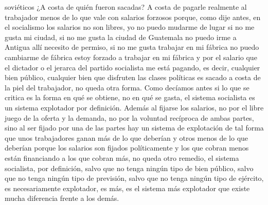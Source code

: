 soviéticos ¿A costa de quién fueron sacadas? A costa de pagarle realmente al trabajador menos de lo que vale con salarios forzosos porque, como dije antes, en el socialismo los salarios no son libres, yo no puedo mudarme de lugar si no me gusta mi ciudad, si no me gusta la ciudad de Guatemala no puedo irme a Antigua allí necesito de permiso, si no me gusta trabajar en mi fábrica no puedo cambiarme de fábrica estoy forzado a trabajar en mi fábrica y por el salario que el dictador o el jerarca del partido socialista me está pagando, es decir, cualquier bien público, cualquier bien que disfruten las clases políticas es sacado a costa de la piel del trabajador, no queda otra forma. Como decíamos antes si lo que se critica es la forma en qué se obtiene, no en qué se gasta, el sistema socialista es un sistema explotador por definición. Además al fijarse los salarios, no por el libre juego de la oferta y la demanda, no por la voluntad recíproca de ambas partes, sino al ser fijado por una de las partes hay un sistema de explotación de tal forma que unos trabajadores ganan más de lo que deberían y otros menos de lo que deberían porque los salarios son fijados políticamente y los que cobran menos están financiando a los que cobran más, no queda otro remedio, el sistema socialista, por definición, salvo que no tenga ningún tipo de bien público, salvo que no tenga ningún tipo de previsión, salvo que no tenga ningún tipo de ejército, es necesariamente explotador, es más, es el sistema más explotador que existe mucha diferencia frente a los demás.

